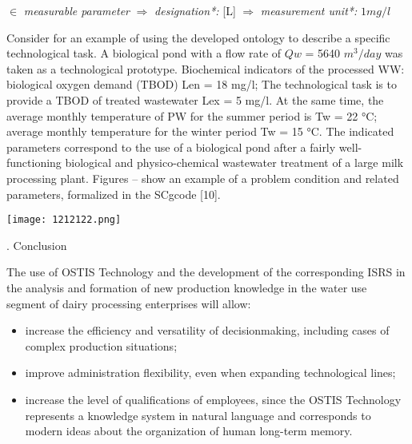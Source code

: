 \documentclass{article}
\begin{document}
\begin{multicols}{2}
{}
$\in$\textit{ measurable parameter}
\vspace{

}
$\Rightarrow$ \textit{designation*:}
\vspace{

}
[L]
\vspace{

}
$\Rightarrow$ \textit{measurement unit*:}
\vspace{

}
$1 mg/l$

Consider for an example of using the developed ontology to describe a specific technological task. A biological
pond with a flow rate of $Qw$ = 5640 $m^3/day$ was taken as
a technological prototype. Biochemical indicators of the
processed WW: biological oxygen demand (TBOD) Len
= 18 mg/l; The technological task is to provide a TBOD
of treated wastewater Lex = 5 mg/l. At the same time,
the average monthly temperature of PW for the summer
period is Tw = 22 °C; average monthly temperature for
the winter period Tw = 15 °C. The indicated parameters
correspond to the use of a biological pond after a
fairly well-functioning biological and physico-chemical
wastewater treatment of a large milk processing plant.
Figures – show an example of a problem condition and related parameters, formalized in the SCgcode [10].

 
 
\texttt{[image: 1212122.png]}
\begin{center}
    

  \end{center}
   
    \label{fig:enter-label}

   \begin{center}

. Conclusion
       
   \end{center}
 The use of OSTIS Technology and the development of
the corresponding ISRS in the analysis and formation of
new production knowledge in the water use segment of
dairy processing enterprises will allow:
\begin{itemize}
\item increase the efficiency and versatility of decisionmaking, including cases of complex production situations;
\item improve administration flexibility, even when expanding technological lines;
\item increase the level of qualifications of employees,
since the OSTIS Technology represents a knowledge
system in natural language and corresponds to modern ideas about the organization of human long-term
memory.\vspace{

}
\end{itemize}
\end{multicols}
\end{document}
